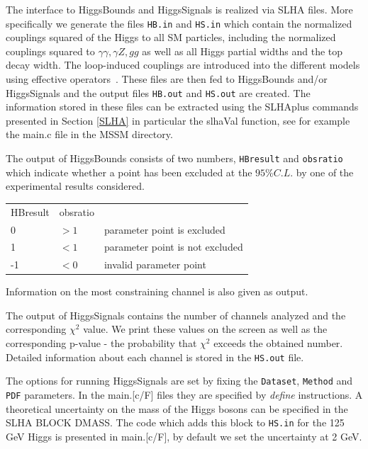 \documentclass[12pt,a4paper]{article}
\begin{document}
{The interface to HiggsBounds and HiggsSignals  is realized via  SLHA files.  More specifically
we generate  the files 
\verb|HB.in| and \verb|HS.in| which  contain  
the normalized  couplings squared of the Higgs to all SM particles,
including the normalized couplings squared to  $\gamma\gamma,\gamma Z, gg$  as well as all Higgs partial widths and the  top decay width.
The loop-induced couplings are introduced into the different models using effective operators~\cite{Belanger:2013oya,Belyaev:2012qa}.
These  files are then  fed to HiggsBounds and/or HiggsSignals  
and the output files \verb|HB.out| and \verb|HS.out| are created. The information
stored in these files can be extracted using the SLHAplus commands presented in
Section \ref{SLHA} in particular the slhaVal function, see for example the main.c file in the MSSM directory. 

The output of HiggsBounds consists of two numbers, \verb|HBresult| and \verb|obsratio| which indicate whether a point has been excluded at the $95\%C.L.$ by one of the experimental results considered. 

\begin{tabular}{lll}
HBresult&obsratio&\\
0& $>1$ & parameter point is excluded\\
1& $<1$ & parameter point is not excluded\\
-1& $<0$ & invalid parameter point\\
\end{tabular}

\noindent
Information on the most constraining channel is also given as output.

The output of HiggsSignals contains the number of  channels analyzed  and the
corresponding  $\chi^2$ value. We print these values on the screen as well
as the corresponding p-value - the probability that  $\chi^2$ exceeds the
obtained number. Detailed information about each  channel is stored in the
\verb|HS.out| file. 

The options for running HiggsSignals  are set by  fixing the  \verb|Dataset|, \verb|Method| and
\verb|PDF| parameters. In the main.[c/F] files they are specified by {\it define}
instructions.
A theoretical uncertainty  on the  mass of the Higgs bosons can be specified in the SLHA BLOCK DMASS. 
The code which adds this block to \verb|HS.in| for the 125 GeV Higgs is presented in main.[c/F],  by default we set the uncertainty at  2 GeV. 

}
\end{document}
